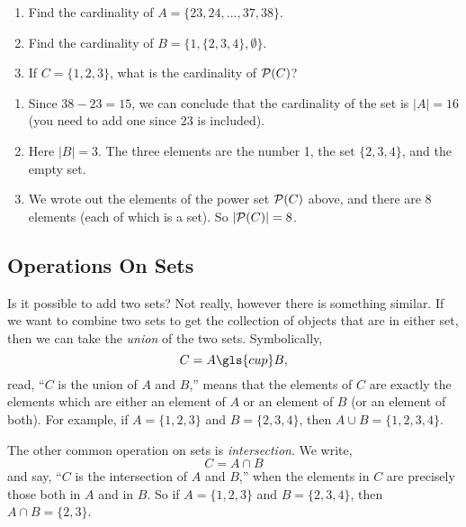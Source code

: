 \documentclass[12pt]{article}
\begin{document}
\begin{example}
\begin{enumerate}
\item Find the cardinality of $A = \{23, 24, \ldots, 37, 38\}$.
\item Find the cardinality of $B = \{1, \{2, 3, 4\}, \emptyset\}$.
\item If $C = \{1,2,3\}$, what is the cardinality of $\mathcal P(C)$?
\end{enumerate}

\begin{solution}
\begin{enumerate}
\item Since $38 - 23 = 15$, we can conclude that the cardinality of the set is $|A| = 16$ (you need to add one since 23 is included).
\item Here $|B| = 3$.  The three elements are the number 1, the set $\{2,3,4\}$, and the empty set.
\item We wrote out the elements of the power set $\mathcal P(C)$ above, and there are 8 elements (each of which is a set).  So $|\mathcal P(C)| = 8$.\footnotemark
\end{enumerate}

\end{solution}
\end{example}

\subsection{Operations On Sets}

Is it possible to add two sets?  Not really, however there is something similar.  If we want to combine two sets to get the collection of objects that are in either set, then we can take the \emph{union} of the two sets.  Symbolically,
\[ C = A \gls{cup} B,\]
read,  ``$C$ is the union of $A$ and $B$,''  means that the elements of $C$ are exactly the elements which are either an element of $A$ or an element of $B$ (or an element of both).  For example, if $A = \{1, 2, 3\}$ and $B = \{2, 3, 4\}$, then $A \cup B = \{1, 2, 3, 4\}$.

The other common operation on sets is \emph{intersection}.  We write,
\[ C = A \cap B\]
and say, ``$C$ is the intersection of $A$ and $B$,'' when the elements in $C$ are precisely those both in $A$ and in $B$.  So if $A = \{1, 2, 3\}$ and $B = \{2, 3, 4\}$, then $A \cap B = \{2, 3\}$.
\end{document}
